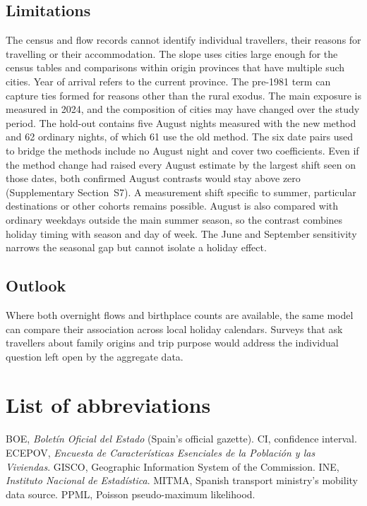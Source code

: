 \documentclass[pdflatex,sn-mathphys-num,referee]{sn-jnl}
\begin{document}
\subsection{Limitations} The census and flow records cannot identify individual travellers, their reasons for travelling or their accommodation. The slope uses cities large enough for the census tables and comparisons within origin provinces that have multiple such cities. Year of arrival refers to the current province. The pre-1981 term can capture ties formed for reasons other than the rural exodus. The main exposure is measured in 2024, and the composition of cities may have changed over the study period. The hold-out contains five August nights measured with the new method and 62 ordinary nights, of which 61 use the old method. The six date pairs used to bridge the methods include no August night and cover two coefficients. Even if the method change had raised every August estimate by the largest shift seen on those dates, both confirmed August contrasts would stay above zero (Supplementary Section~S7). A measurement shift specific to summer, particular destinations or other cohorts remains possible. August is also compared with ordinary weekdays outside the main summer season, so the contrast combines holiday timing with season and day of week. The June and September sensitivity narrows the seasonal gap but cannot isolate a holiday effect.

\subsection{Outlook} Where both overnight flows and birthplace counts are available, the same model can compare their association across local holiday calendars. Surveys that ask travellers about family origins and trip purpose would address the individual question left open by the aggregate data.

\section*{List of abbreviations}
BOE, \emph{Boletín Oficial del Estado} (Spain's official gazette).
CI, confidence interval.
ECEPOV, \emph{Encuesta de Características Esenciales de la Población y las Viviendas}.
GISCO, Geographic Information System of the Commission.
INE, \emph{Instituto Nacional de Estadística}.
MITMA, Spanish transport ministry's mobility data source.
PPML, Poisson pseudo-maximum likelihood.
\end{document}
